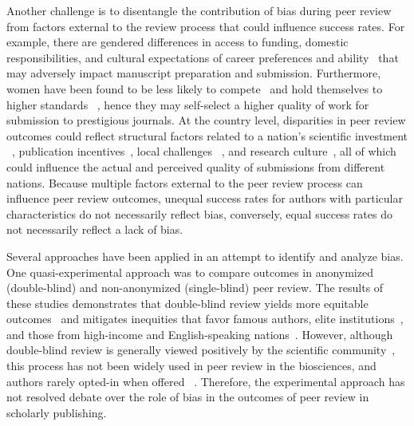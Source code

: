 \documentclass[10pt,letterpaper]{article}
\begin{document}
Another challenge is to disentangle the contribution of bias during peer review from factors external to the review process that could influence success rates. For example, there are gendered differences in access to funding, domestic responsibilities, and cultural expectations of career preferences and ability~\cite{ceci_understanding_2011, ceci_women_2014} that may adversely impact manuscript preparation and submission. Furthermore, women have been found to be less likely to compete~\cite{niederle_gender_2011} and hold themselves to higher standards ~\cite{hengel_publishing_2017}, hence they may self-select a higher quality of work for submission to prestigious journals. At the country level, disparities in peer review outcomes could reflect structural factors related to a nation’s scientific investment ~\cite{may_scientific_1997, king_scientific_2004}, publication incentives~\cite{quan_publish_2017, duszak_publishing_2008}, local challenges ~\cite{salager-meyer_scientific_2008}, and research culture~\cite{yang_policy:_2016}, all of which could influence the actual and perceived quality of submissions from different nations. Because multiple factors external to the peer review process can influence peer review outcomes, unequal success rates for authors with particular characteristics do not necessarily reflect bias, conversely, equal success rates do not necessarily reflect a lack of bias. 

Several approaches have been applied in an attempt to identify and analyze bias. One quasi-experimental approach was to compare outcomes in anonymized (double-blind) and non-anonymized (single-blind) peer review. The results of these studies demonstrates that double-blind review yields more equitable outcomes~\cite{budden_double-blind_2008} and mitigates inequities that favor famous authors, elite institutions~\cite{tomkins_reviewer_2017, blank_effects_1991, okike_single-blind_2016}, and those from high-income and English-speaking nations~\cite{harris_explicit_2017}. However, although double-blind review is generally viewed positively by the scientific community~\cite{ware_peer_2008, kmietowicz_double_2008}, this process has not been widely used in peer review in the biosciences, and authors rarely opted-in when offered ~\cite{mcgillivray_uptake_2018}. Therefore, the experimental approach has not resolved debate over the role of bias in the outcomes of peer review in scholarly publishing. 
\end{document}
